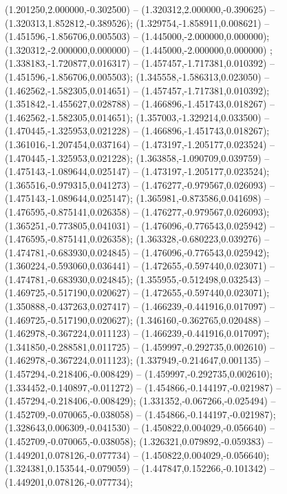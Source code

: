  (1.201250,2.000000,-0.302500) -- (1.320312,2.000000,-0.390625) -- (1.320313,1.852812,-0.389526);
 (1.329754,-1.858911,0.008621) -- (1.451596,-1.856706,0.005503) -- (1.445000,-2.000000,0.000000);
 (1.320312,-2.000000,0.000000) -- (1.445000,-2.000000,0.000000) ;
 (1.338183,-1.720877,0.016317) -- (1.457457,-1.717381,0.010392) -- (1.451596,-1.856706,0.005503);
 (1.345558,-1.586313,0.023050) -- (1.462562,-1.582305,0.014651) -- (1.457457,-1.717381,0.010392);
 (1.351842,-1.455627,0.028788) -- (1.466896,-1.451743,0.018267) -- (1.462562,-1.582305,0.014651);
 (1.357003,-1.329214,0.033500) -- (1.470445,-1.325953,0.021228) -- (1.466896,-1.451743,0.018267);
 (1.361016,-1.207454,0.037164) -- (1.473197,-1.205177,0.023524) -- (1.470445,-1.325953,0.021228);
 (1.363858,-1.090709,0.039759) -- (1.475143,-1.089644,0.025147) -- (1.473197,-1.205177,0.023524);
 (1.365516,-0.979315,0.041273) -- (1.476277,-0.979567,0.026093) -- (1.475143,-1.089644,0.025147);
 (1.365981,-0.873586,0.041698) -- (1.476595,-0.875141,0.026358) -- (1.476277,-0.979567,0.026093);
 (1.365251,-0.773805,0.041031) -- (1.476096,-0.776543,0.025942) -- (1.476595,-0.875141,0.026358);
 (1.363328,-0.680223,0.039276) -- (1.474781,-0.683930,0.024845) -- (1.476096,-0.776543,0.025942);
 (1.360224,-0.593060,0.036441) -- (1.472655,-0.597440,0.023071) -- (1.474781,-0.683930,0.024845);
 (1.355955,-0.512498,0.032543) -- (1.469725,-0.517190,0.020627) -- (1.472655,-0.597440,0.023071);
 (1.350888,-0.437263,0.027417) -- (1.466239,-0.441916,0.017097) -- (1.469725,-0.517190,0.020627);
 (1.346160,-0.362765,0.020488) -- (1.462978,-0.367224,0.011123) -- (1.466239,-0.441916,0.017097);
 (1.341850,-0.288581,0.011725) -- (1.459997,-0.292735,0.002610) -- (1.462978,-0.367224,0.011123);
 (1.337949,-0.214647,0.001135) -- (1.457294,-0.218406,-0.008429) -- (1.459997,-0.292735,0.002610);
 (1.334452,-0.140897,-0.011272) -- (1.454866,-0.144197,-0.021987) -- (1.457294,-0.218406,-0.008429);
 (1.331352,-0.067266,-0.025494) -- (1.452709,-0.070065,-0.038058) -- (1.454866,-0.144197,-0.021987);
 (1.328643,0.006309,-0.041530) -- (1.450822,0.004029,-0.056640) -- (1.452709,-0.070065,-0.038058);
 (1.326321,0.079892,-0.059383) -- (1.449201,0.078126,-0.077734) -- (1.450822,0.004029,-0.056640);
 (1.324381,0.153544,-0.079059) -- (1.447847,0.152266,-0.101342) -- (1.449201,0.078126,-0.077734);
